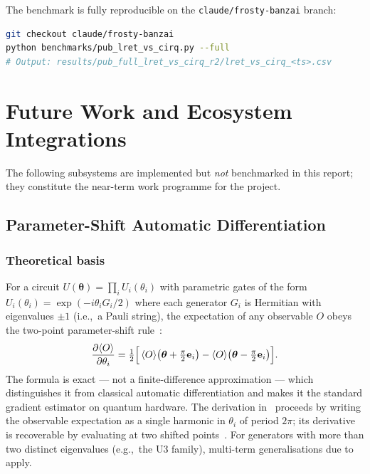 \documentclass[11pt,a4paper]{article}
\begin{document}
The benchmark is fully reproducible on the \texttt{claude/frosty-banzai} branch:
\begin{lstlisting}[language=bash, caption={Reproducing the benchmark}]
git checkout claude/frosty-banzai
python benchmarks/pub_lret_vs_cirq.py --full
# Output: results/pub_full_lret_vs_cirq_r2/lret_vs_cirq_<ts>.csv
\end{lstlisting}

\section{Future Work and Ecosystem Integrations}
\label{sec:future}

The following subsystems are implemented but \emph{not} benchmarked in this report;
they constitute the near-term work programme for the project.

\subsection{Parameter-Shift Automatic Differentiation}
\label{sec:future-autodiff}

\subsubsection*{Theoretical basis}
For a circuit $U(\boldsymbol{\theta}) = \prod_i U_i(\theta_i)$ with parametric gates
of the form $U_i(\theta_i) = \exp(-i\theta_i G_i/2)$ where each generator $G_i$ is
Hermitian with eigenvalues $\pm 1$ (i.e.,\ a Pauli string), the expectation of any
observable $O$ obeys the two-point parameter-shift
rule~\cite{mitarai2018,schuld2019}:
\begin{equation}
  \frac{\partial \langle O \rangle}{\partial \theta_i}
  = \tfrac{1}{2}\Bigl[\,
      \langle O \rangle\bigl(\boldsymbol{\theta} + \tfrac{\pi}{2}\mathbf{e}_i\bigr)
    - \langle O \rangle\bigl(\boldsymbol{\theta} - \tfrac{\pi}{2}\mathbf{e}_i\bigr)
    \Bigr].
\end{equation}
The formula is exact --- not a finite-difference approximation --- which
distinguishes it from classical automatic differentiation and makes it the standard
gradient estimator on quantum hardware. The derivation in~\cite{schuld2019} proceeds
by writing the observable expectation as a single harmonic in $\theta_i$ of period
$2\pi$; its derivative is recoverable by evaluating at two shifted
points~\cite{schuld2019}. For generators with more than two distinct
eigenvalues (e.g.,\ the $\text{U}3$ family), multi-term generalisations
due to~\cite{banchi2021} apply.
\end{document}
